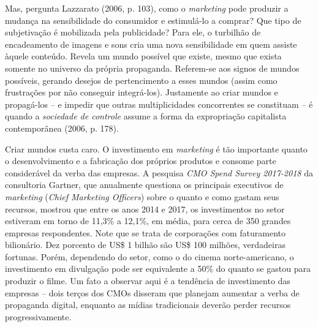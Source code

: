 Mas, pergunta Lazzarato (2006, p. 103), como o \emph{marketing} pode
produzir a mudança na sensibilidade do consumidor e estimulá-lo a
comprar? Que tipo de subjetivação é mobilizada pela publicidade? Para
ele, o turbilhão de encadeamento de imagens e sons cria uma nova
sensibilidade em quem assiste àquele conteúdo. Revela um mundo possível
que existe, mesmo que exista somente no universo da própria propaganda.
Referem-se aos signos de mundos possíveis, gerando desejos de
pertencimento a esses mundos (assim como frustrações por não conseguir
integrá-los). Justamente ao criar mundos e propagá-los -- e impedir que
outras multiplicidades concorrentes se constituam -- é quando a
\emph{sociedade de controle} assume a forma da expropriação capitalista
contemporânea (2006, p. 178).

Criar mundos custa caro. O investimento em \emph{marketing} é tão
importante quanto o desenvolvimento e a fabricação dos próprios produtos
e consome parte considerável da verba das empresas. A pesquisa \emph{CMO
Spend Survey 2017-2018} da consultoria Gartner, que anualmente questiona
os principais executivos de \emph{marketing} (\emph{Chief Marketing
Officers}) sobre o quanto e como gastam seus recursos, mostrou que entre
os anos 2014 e 2017, os investimentos no setor estiveram em torno de
11,3\% a 12,1\%, em média, para cerca de 350 grandes empresas
respondentes. Note que se trata de corporações com faturamento
bilionário. Dez porcento de US\$ 1 bilhão são US\$ 100 milhões,
verdadeiras fortunas. Porém, dependendo do setor, como o do cinema
norte-americano, o investimento em divulgação pode ser equivalente a
50\% do quanto se gastou para produzir o filme. Um fato a observar aqui
é a tendência de investimento das empresas -- dois terços dos CMOs
disseram que planejam aumentar a verba de propaganda digital, enquanto
as mídias tradicionais deverão perder recursos progressivamente.

